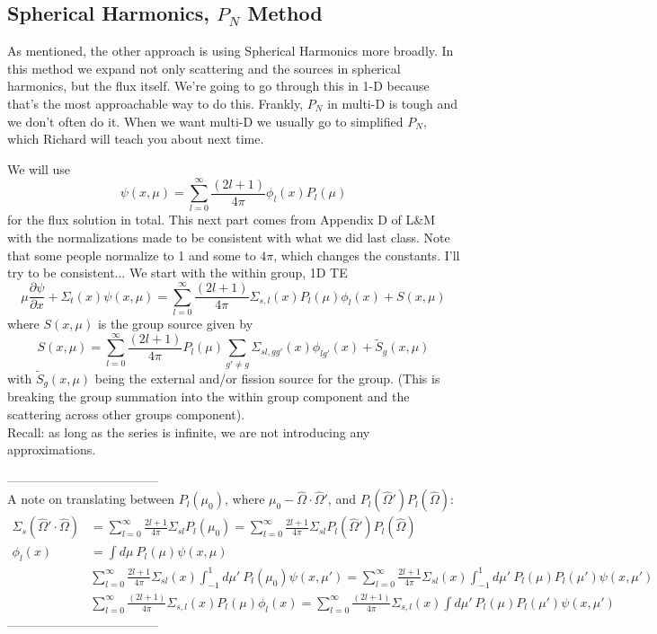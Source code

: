 \documentclass[12pt]{article}
\newcommand{\vOmega}{\ensuremath{\hat{\Omega}}}
\begin{document}
\subsection*{Spherical Harmonics, $P_N$ Method}
As mentioned, the other approach is using Spherical Harmonics more broadly. In this method we expand not only scattering and the sources in spherical harmonics, but the flux itself. We're going to go through this in 1-D because that's the most approachable way to do this. Frankly, $P_N$ in multi-D is tough and we don't often do it. When we want multi-D we usually go to simplified $P_N$, which Richard will teach you about next time. 

We will use
\[
\psi(x, \mu) = \sum_{l=0}^{\infty} \frac{(2l+1)}{4\pi} \phi_l(x)P_l(\mu)
\]
for the flux solution in total. This next part comes from Appendix D of L\&M with the normalizations made to be consistent with what we did last class. Note that some people normalize to 1 and some to $4\pi$, which changes the constants. I'll try to be consistent... We start with the within group, 1D TE
\[
\mu \frac{\partial \psi}{\partial x} + \Sigma_t(x)\psi(x,\mu) = \sum_{l=0}^{\infty} \frac{(2l+1)}{4\pi} \Sigma_{s,l}(x) P_l(\mu)\phi_l(x) + S(x,\mu)
\]
where $S(x,\mu)$ is the group source given by
\[
S(x,\mu) = \sum_{l=0}^{\infty} \frac{(2l+1)}{4\pi} P_l(\mu) \sum_{g' \neq g} \Sigma_{sl,gg'}(x) \phi_{lg'}(x) + \tilde{S}_g(x,\mu)
\]
with $\tilde{S}_g(x,\mu)$ being the external and/or fission source for the group. 
(This is breaking the group summation into the within group component and the scattering across other groups component).\\
Recall: as long as the series is infinite, we are not introducing any approximations.

------------------------------------\\
A note on translating between $P_l(\mu_0)$, where $\mu_0 - \vOmega \cdot \vOmega'$, and $P_l(\vOmega')P_l(\vOmega)$:
\begin{align*}
\Sigma_s(\vOmega' \cdot \vOmega) &= \sum_{l=0}^{\infty} \frac{2l+1}{4\pi} \Sigma_{sl} P_l(\mu_0) = \sum_{l=0}^{\infty} \frac{2l+1}{4\pi} \Sigma_{sl} P_l(\vOmega')P_l(\vOmega) \\
\phi_l(x) &= \int d\mu \: P_{l}(\mu)\psi(x,\mu)\\
%
&\sum_{l=0}^{\infty} \frac{2l+1}{4\pi} \Sigma_{sl}(x) \int_{-1}^1 d\mu'\: P_l(\mu_0) \psi(x, \mu') =  \sum_{l=0}^{\infty} \frac{2l+1}{4\pi} \Sigma_{sl}(x) \int_{-1}^1 d\mu'\: P_l(\mu)P_{l}(\mu')\psi(x,\mu') \\
%
&\sum_{l=0}^{\infty} \frac{(2l+1)}{4\pi} \Sigma_{s,l}(x) P_l(\mu)\phi_l(x)  = \sum_{l=0}^{\infty} \frac{(2l+1)}{4\pi} \Sigma_{s,l}(x)\int d\mu' \: P_l(\mu)P_{l}  (\mu')\psi(x,\mu')
\end{align*}
------------------------------------
\end{document}
